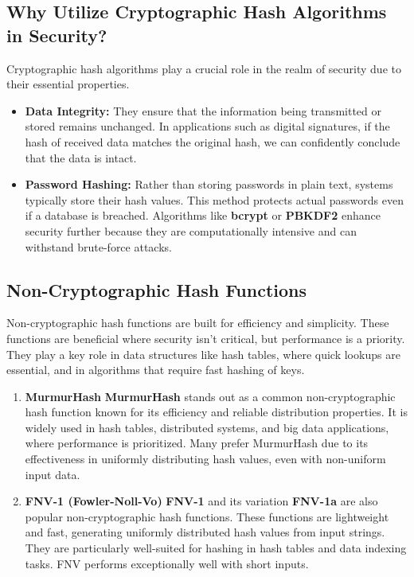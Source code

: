 \documentclass[11pt,a4paper]{article}
\begin{document}
    \subsection*{Why Utilize Cryptographic Hash Algorithms in Security?}
    Cryptographic hash algorithms play a crucial role in the realm of security due to their essential properties.
        \begin{itemize}
            \item \textbf{Data Integrity:} They ensure that the information being transmitted or stored remains unchanged. In applications such as digital signatures, if the hash of received data matches the original hash, we can confidently conclude that the data is intact.

            \item \textbf{Password Hashing:} Rather than storing passwords in plain text, systems typically store their hash values. This method protects actual passwords even if a database is breached. Algorithms like \textbf{bcrypt} or \textbf{PBKDF2} enhance security further because they are computationally intensive and can withstand brute-force attacks.

        \end{itemize}

    \subsection*{Non-Cryptographic Hash Functions}
    Non-cryptographic hash functions are built for efficiency and simplicity. These functions are beneficial where security isn’t critical, but performance is a priority. They play a key role in data structures like hash tables, where quick lookups are essential, and in algorithms that require fast hashing of keys.
        \begin{enumerate}
            \item \textbf{MurmurHash}
            \newline
            \textbf{MurmurHash} stands out as a common non-cryptographic hash function known for its efficiency and reliable distribution properties. It is widely used in hash tables, distributed systems, and big data applications, where performance is prioritized. Many prefer MurmurHash due to its effectiveness in uniformly distributing hash values, even with non-uniform input data.

            \item \textbf{FNV-1 (Fowler-Noll-Vo)}
            \newline
            \textbf{FNV-1} and its variation \textbf{FNV-1a} are also popular non-cryptographic hash functions. These functions are lightweight and fast, generating uniformly distributed hash values from input strings. They are particularly well-suited for hashing in hash tables and data indexing tasks. FNV performs exceptionally well with short inputs.

        \end{enumerate}
\end{document}
